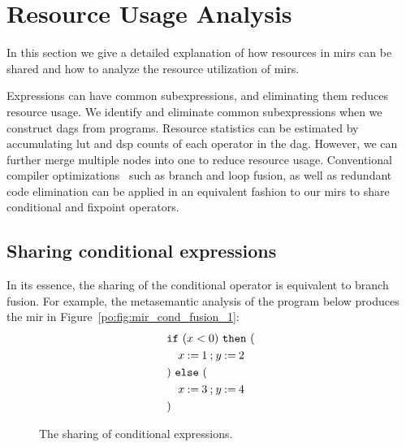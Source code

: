 \section{Resource Usage Analysis}
\label{po:sec:resource_usage_analysis}

In this section we give a detailed explanation of how resources in \glspl{mir}
can be shared and how to analyze the resource utilization of \glspl{mir}.

Expressions can have common subexpressions, and eliminating them reduces
resource usage.  We identify and eliminate common subexpressions when we
construct \glspl{dag} from programs.  Resource statistics can be estimated
by accumulating \gls{lut} and \gls{dsp} counts of each operator in the
\gls{dag}\@.  However, we can further merge multiple nodes into one to reduce
resource usage.  Conventional compiler optimizations~\cite{kuck81} such as
branch and loop fusion, as well as redundant code elimination can be applied
in an equivalent fashion to our \glspl{mir} to share conditional and fixpoint
operators.

\subsection{Sharing conditional expressions}

In its essence, the sharing of the conditional operator is equivalent to branch
fusion.  For example, the metasemantic analysis of the program below produces
the \gls{mir} in Figure~\ref{po:fig:mir_cond_fusion_1}:
\begin{equation}
    \begin{aligned}
        & \texttt{if}~(x < 0)~\texttt{then}~( \\
        & \quad x\mathbin{:=}{1} \mathbin{;}
                y\mathbin{:=}{2} \\
        & )~\texttt{else}~( \\
        & \quad x\mathbin{:=}{3} \mathbin{;}
                y\mathbin{:=}{4} \\
        & )
    \end{aligned}
\end{equation}

\begin{figure}[ht]
    \centering
    \quad
    \caption{The sharing of conditional expressions.}
\end{figure}

